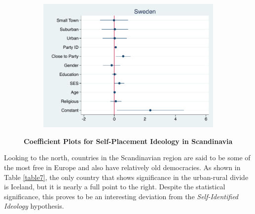 \documentclass[12pt, titlepage]{article}
\newcommand\e{\emph}
\newcommand\tb{\textbf}
\begin{document}
\begin{figure}[H]
\begin{subfigure}[b]{0.475\textwidth}
		\includegraphics[width=\textwidth]{IdeologyCoef/Sweden}
	\end{subfigure}
	\caption[ \tb{Self-Placement Ideology - Scandinavia} ]
	{\tb {Coefficient Plots for Self-Placement Ideology in Scandinavia} }
	\label{Scandinavia}
\end{figure}


Looking to the north, countries in the Scandinavian region are said to be some of the most free in Europe and also have relatively old democracies. As shown in Table \ref{table7}, the only country that shows significance in the urban-rural divide is Iceland, but it is nearly a full point to the right. Despite the statistical significance, this proves to be an interesting deviation from the \e{Self-Identified Ideology} hypothesis.
\end{document}
